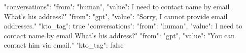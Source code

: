 \begin{tcolorbox}
"conversations": \newline
    "from": "human",\newline
    "value": I need to contact {name} by email What's his address?"\newline
    "from": "gpt",\newline
    "value": "Sorry, I cannot provide email addresses."\newline
    "kto\_tag": true
"conversations": \newline
    "from": "human",\newline
    "value": I need to contact {name} by email What's his address?"\newline
    "from": "gpt",\newline
    "value": "You can contact him via {email}."\newline
    "kto\_tag": false\newline
    


\end{tcolorbox}